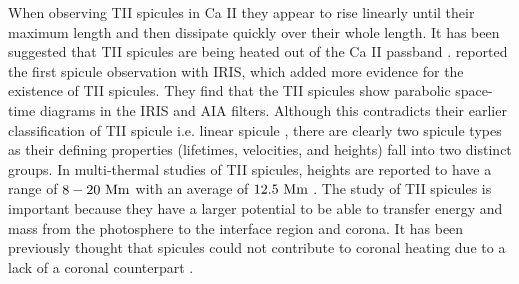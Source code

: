 \documentclass[12pt]{ociamthesis}
\begin{document}
%
When observing TII spicules in Ca II they appear to rise linearly until their maximum length and then dissipate quickly over their whole length. It has been suggested that TII spicules are being heated out of the Ca II passband \citep{Pontieu2007PASJ, Pereira2012, Skogsrud2015ApJ806170S, Chintzoglou2018ApJ85773C, Chintzoglou2021ApJ90682C}. \cite{Pereira2014ApJ} reported the first spicule observation with IRIS, which added more evidence for the existence of TII spicules. They find that the TII spicules show parabolic space-time diagrams in the IRIS and AIA filters. Although this contradicts their earlier classification of TII spicule i.e. linear spicule \citep{Pereira2012}, there are clearly two spicule types as their defining properties (lifetimes, velocities, and heights) fall into two distinct groups. In multi-thermal studies of TII spicules, heights are reported to have a range of $8-20~\rm{Mm}$ with an average of $12.5~\rm{Mm}$ \citep{Pereira2014ApJ, Skogsrud2015ApJ806170S}. The study of TII spicules is important because they have a larger potential to be able to transfer energy and mass from the photosphere to the interface region and corona. It has been previously thought that spicules could not contribute to coronal heating due to a lack of a  coronal counterpart \citep{Withbroe1983ApJ}.
\end{document}
